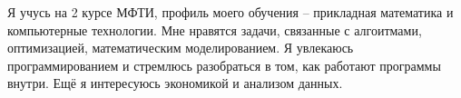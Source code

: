 Я учусь на 2 курсе МФТИ, профиль моего обучения -- прикладная математика и компьютерные технологии.
Мне нравятся задачи, связанные с алгоитмами, оптимизацией, математическим моделированием.
Я увлекаюсь программированием и стремлюсь разобраться в том, как работают программы внутри.
Ещё я интересуюсь экономикой и анализом данных.
